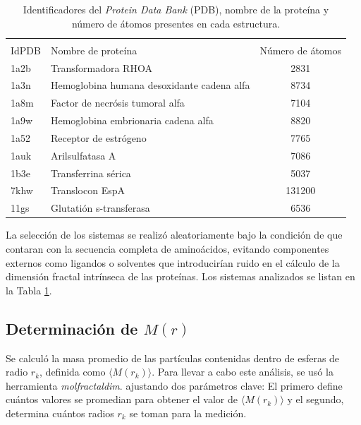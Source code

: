  	\begin{table}[h!]
 		\centering
 		\begin{tabular}{llc}
 			\multicolumn{3}{c}{} \\ 
 			IdPDB & Nombre de prote\'{i}na & N\'{u}mero de \'{a}tomos \\
 			\hline
 			1a2b & Transformadora RHOA & 2831 \\
 			1a3n & Hemoglobina humana desoxidante cadena alfa & 8734 \\
 			1a8m & Factor de necr\'{o}sis tumoral alfa & 7104 \\
 			1a9w & Hemoglobina embrionaria cadena alfa & 8820 \\
 			1a52 & Receptor de estr\'{o}geno & 7765 \\
 			1auk & Arilsulfatasa A & 7086 \\
 			1b3e & Transferrina s\'{e}rica & 5037 \\
 			7khw & Translocon EspA & 131200 \\
 			11gs & Glutati\'{o}n s-transferasa & 6536 \\ 
 			\hline
 		\end{tabular}
 		\caption{Identificadores del \emph{Protein Data Bank} (PDB), nombre de la prote\'{i}na y n\'{u}mero de \'{a}tomos presentes en cada estructura.}
 		\label{Tabla:ids9}
 	\end{table}
 	
 	
 	
 	La selecci\'{o}n de los sistemas se realiz\'{o} aleatoriamente bajo la condici\'{o}n de que contaran con la secuencia completa de amino\'{a}cidos, evitando componentes externos como ligandos o solventes que introducir\'{i}an ruido en el c\'{a}lculo de la dimensi\'{o}n fractal intr\'{i}nseca de las prote\'{i}nas. Los sistemas analizados se listan en la Tabla \ref{Tabla:ids9}.
 
	
	
	
	\subsection{Determinaci\'{o}n de $M(r)$}
	
	Se calcul\'{o} la masa promedio de las part\'{i}culas contenidas dentro de esferas de radio $r_k$, definida como $\langle M(r_{k}) \rangle$. 
	Para llevar a cabo este an\'{a}lisis, se us\'{o} la herramienta \textit{molfractaldim}. ajustando dos par\'{a}metros clave: El primero define cu\'{a}ntos valores se promedian para obtener el valor de $\langle M(r_{k}) \rangle$ y el segundo, determina cu\'{a}ntos radios $r_{k}$ se toman para la medici\'{o}n.
	
